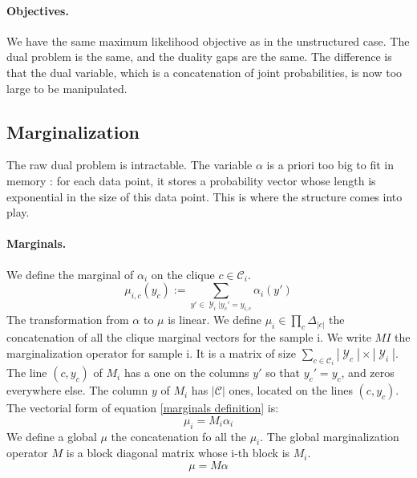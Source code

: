 \documentclass{article}
\DeclareMathOperator{\1}{\mathbb{1}}
\DeclareMathOperator{\Y}{\mathcal{Y}}
\begin{document}
\paragraph{Objectives.}
We have the same maximum likelihood objective as in the unstructured case.
The dual problem is the same, and the duality gaps are the same.
The difference is that the dual variable, which is a concatenation of joint probabilities, is now too large to be manipulated.

\subsection{Marginalization}
The raw dual problem is intractable.
The variable $\alpha$ is a priori too big to fit in memory : for each data point, it stores a probability vector whose length is exponential in the size of this data point.
This is where the structure comes into play.

\paragraph{Marginals.}
We define the marginal of $\alpha_i$ on the clique $c \in \mathcal C_i$.
\begin{equation}
	\label{marginals definition}
	\mu_{i, c}(y_c) := \sum_{y'\in \Y_i | y_c' = y_{i, c}} \alpha_i(y')
\end{equation}
The transformation from $\alpha$ to $\mu$ is linear.
We define $\mu_i \in \prod_c \Delta_|c|$ the concatenation of all the clique marginal vectors for the sample i.
We write $MI$ the marginalization operator for sample i.
It is a matrix of size $\sum_{c \in \mathcal C_i} |\Y_c| \times |\Y_i |$.
The line $(c, y_c)$ of $M_i$ has a one on the columns $y'$ so that $y_c'=y_c$, and zeros everywhere else.
The column $y$ of $M_i$ has $|\mathcal C|$ ones, located on the lines $(c, y_c)$.
The vectorial form of equation \ref{marginals definition} is:
\begin{equation*}
	\mu_i = M_i \alpha_i
\end{equation*}
We define a global $\mu$ the concatenation fo all the $\mu_i$.
The global marginalization operator $M$ is a block diagonal matrix whose i-th block is $M_i$.
\begin{equation}
	\label{marginals vectorial}
	\mu = M \alpha
\end{equation} 
\end{document}
